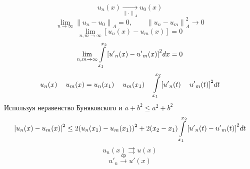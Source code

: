 \[ u_n(x) \underset{{\| \cdot \|}_A}{\rightarrow} u_0(x) \]
\[ \underset{n \rightarrow \infty}{\lim} {\| u_n - u_0 \|}_A = 0, \qquad {\| u_n - u_m \|}_A^2 \rightarrow 0 \]
\[ \underset{n,m \rightarrow \infty}{\lim} \left[ u_n(x) - u_m(x) \right] = 0 \]
\[ \underset{n,m \rightarrow \infty}{\lim} \int\limits_{x_1}^{x_2} {\left[ {u'}_n(x) - {u'}_m(x) \right]}^2 dx = 0 \]
\[ u_n(x) - u_m(x) = u_n(x_1) - u_m(x_1) - \int\limits_{x_1}^{x_2} {\left[ {u'}_n(t) - {u'}_m(t) \right]}^2 dt \]
Используя неравенство Буняковского и $ {a+b}^2 \leq a^2 + b^2 $
\[ {| u_n(x) - u_m(x) |}^2 \leq 2 {(u_n(x_1) - u_m(x_1))}^2 + 2(x_2 - x_1) \int\limits_{x_1}^{x_2} {\left[ {u'}_n(t) - {u'}_m(t) \right]}^2 dt \]
\[ u_n(x) \rightrightarrows u(x) \]
\[ {u'}_n \overset{\text{ср}}{\rightarrow} u'(x) \]

\newpage